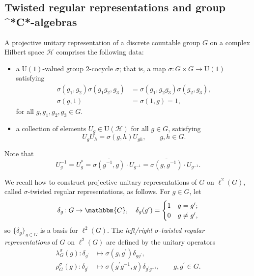 \documentclass{amsart}
\numberwithin{figure}{section}
\numberwithin{equation}{section}
\numberwithin{table}{section}
\theoremstyle{plain}
\theoremstyle{definition}
\theoremstyle{remark}
\theoremstyle{nonumber}
\newcommand{\C}{\mathbb{C}}
\newcommand{\Cst}{\relax\ifmmode\mathrm{C}^*\else\textup{C*}\fi}
\renewcommand{\mathbb}{\mathbbm} %
\begin{document}
\subsection{Twisted regular representations and group
\Cst-algebras}
A projective unitary representation of a discrete countable group $G$ on a complex Hilbert space
$\mathcal{H}$ comprises the following data:
\begin{itemize}
\item a \( \mathrm{U}(1) \)-valued group \( 2 \)-cocycle \( \sigma
\); that is, a map \( \sigma\colon G\times G\to\mathrm{U}(1) \)
satisfying
\begin{equation}\label{eq:2_cocycle_condition}
\begin{aligned}
\sigma(g_1,g_2)\sigma(g_1g_2,g_3)&=\sigma(g_1,g_2g_3)\sigma(g_2,g_3),\\
\sigma(g,1)&=\sigma(1,g)=1,
\end{aligned}
\end{equation}
for all \( g,g_1,g_2,g_3\in G \).
\item a collection of elements \(
U_g\in\mathrm{U}(\mathcal{H}) \) for all \( g\in G \), satisfying
\[ 
  U_gU_h=\sigma(g,h)U_{gh},\qquad g,h\in G.
\]
\end{itemize}
Note that
\begin{equation}\label{eq:twisted.inverse.formula}
U_g^{-1}=U_g^*=\overline{\sigma(g^{-1},g)}\cdot U_{g^{-1}}=\overline{\sigma(g,g^{-1})}\cdot U_{g^{-1}}.
\end{equation}

We recall how to construct projective unitary
representations of \( G \) on \( \ell^2(G) \), called \( \sigma \)-twisted
regular representations, as follows.
For \( g\in G \), let
\[ 
    \delta_g\colon G\to\C,\quad \delta_g(g')=\begin{cases}
    1 & g=g'; \\
    0 & g\neq g',
    \end{cases}  
\]
so \( \{\delta_g\}_{g\in G} \) is a basis for \( \ell^2(G) \). 
The \emph{left/right $\sigma$-twisted regular representations} of $G$ 
on $\ell^2(G)$ are defined by the unitary operators
\begin{equation}\label{eq:twisted_regular_rep}
\begin{aligned}
\lambda_G^\sigma(g)\colon \delta_{g^\prime}&\mapsto \sigma(g,g^\prime)\delta_{gg^\prime},\\
\rho_G^\sigma(g)\colon \delta_{g^\prime}&\mapsto \sigma(g^\prime g^{-1},g)\delta_{g^\prime g^{-1}},\qquad g,g^\prime\in G.
\end{aligned}
\end{equation}
\end{document}
